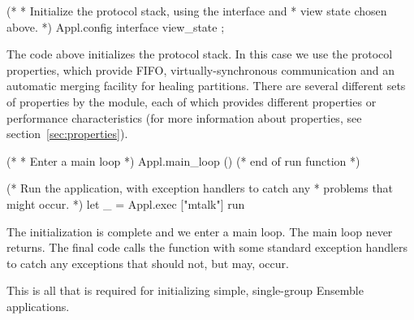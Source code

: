 \begin{codebox}    
  (*
   * Initialize the protocol stack, using the interface and
   * view state chosen above.  
   *)
  Appl.config interface view_state ;
\end{codebox}    
The code above initializes the protocol stack.  In this case we use
the  protocol properties, which provide FIFO,
virtually-synchronous communication and an automatic merging facility
for healing partitions.  There are several different sets of
properties by the  module, each of which
provides different properties or performance characteristics (for
more information about properties, see section~\ref{sec:properties}).

\begin{codebox}    
  (*
   * Enter a main loop
   *)
  Appl.main_loop ()
  (* end of run function *)


(* Run the application, with exception handlers to catch any
 * problems that might occur.
 *)
let _ = Appl.exec ["mtalk"] run
\end{codebox}    
The initialization is complete and we enter a main loop.  The main
loop never returns.  The final code calls the  function
with some standard exception handlers to catch any exceptions that
should not, but may, occur.

This is all that is required for initializing simple, single-group Ensemble
applications.  
